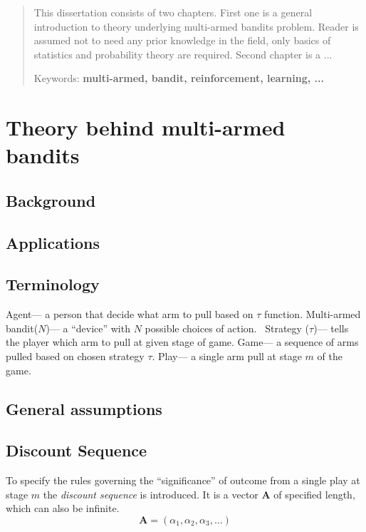 \documentclass[12pt, a4paper, pdflatex]{report}
\begin{document}
\begin{abstract}
This dissertation consists of two chapters. First one is a general introduction to theory underlying multi-armed bandits problem. Reader is assumed not to need any prior knowledge in the field, only basics of statistics and probability theory are required. Second chapter is a ...
\begin{center}
Keywords: \textbf{multi-armed, bandit, reinforcement, learning, ...}
\end{center}
\end{abstract}
\newpage
\tableofcontents
\newpage

\chapter{Theory behind multi-armed bandits}
\lipsum[1]

\section{Background}
\lipsum[1]

\section{Applications}
\lipsum[1]

\section{Terminology}
Agent--- a person that decide what arm to pull based on $\tau$ function.
Multi-armed bandit($N$)--- a ``device'' with $N$ possible choices of action.~\cite{berry+firstedt}
Strategy ($\tau$)--- tells the player which arm to pull at given stage of game.
Game--- a sequence of arms pulled based on chosen strategy $\tau$.
Play--- a single arm pull at stage $m$ of the game.

\section{General assumptions}
\lipsum[1]

\section{Discount Sequence}
To specify the rules governing the ``significance'' of outcome from a single play at stage $m$ the \emph{discount sequence} is introduced. It is a vector $\mathbf{A}$ of specified length, which can also be infinite.
$$
\mathbf{A} = \left( \alpha_1, \alpha_2, \alpha_3, ... \right)
$$
\end{document}
